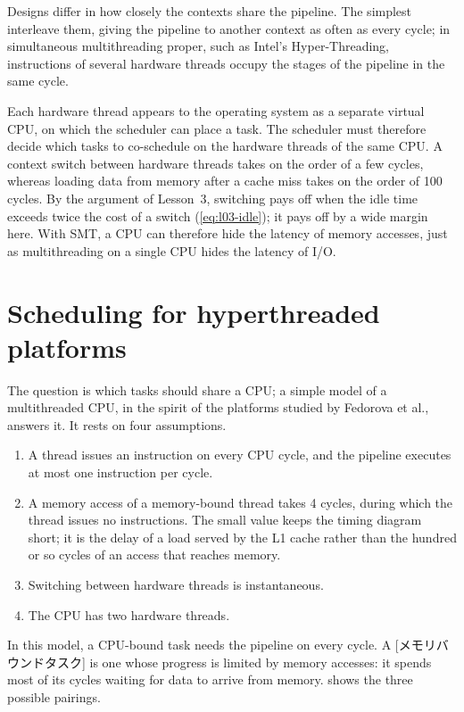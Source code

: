\documentclass[../main.tex]{subfiles}
\begin{document}
Designs differ in how closely the contexts share the pipeline.  The simplest
interleave them, giving the pipeline to another context as often as every
cycle; in simultaneous multithreading proper, such as Intel's
Hyper-Threading, instructions of several hardware threads occupy the stages
of the pipeline in the same cycle.

Each hardware thread appears to the operating system as a separate virtual
CPU, on which the scheduler can place a task.  The scheduler must therefore
decide which tasks to co-schedule on the hardware threads of the same CPU.
A context switch between hardware threads takes on the order of a few
cycles, whereas loading data from memory after a cache miss takes on the
order of 100 cycles.  By the argument of Lesson~3, switching pays off when
the idle time exceeds twice the cost of a switch (\cref{eq:l03-idle}); it
pays off by a wide margin here.  With SMT, a CPU can therefore hide the
latency of memory accesses, just as multithreading on a single CPU hides the
latency of I/O.

\section{Scheduling for hyperthreaded platforms}
\label{sec:l07-smt-sched}

The question is which tasks should share a CPU; a simple model of a
multithreaded CPU, in the spirit of the platforms studied by Fedorova et
al., answers it.  It rests on four assumptions.
\begin{enumerate}
  \item A thread issues an instruction on every CPU cycle, and the pipeline
    executes at most one instruction per cycle.
  \item A memory access of a memory-bound thread takes 4 cycles, during which
    the thread issues no instructions.  The small value keeps the timing
    diagram short; it is the delay of a load served by the L1 cache rather
    than the hundred or so cycles of an access that reaches memory.
  \item Switching between hardware threads is instantaneous.
  \item The CPU has two hardware threads.
\end{enumerate}
In this model, a CPU-bound task needs the pipeline on every cycle.  A
[メモリバウンドタスク] is one whose progress is
limited by memory accesses: it spends most of its cycles waiting for data to
arrive from memory.   shows the three possible pairings.
\end{document}
